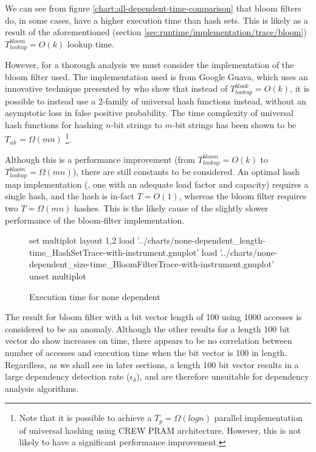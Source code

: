 	We can see from figure \ref{chart:all-dependent-time-comparison} that bloom filters do, in some cases, have a higher execution time than hash sets. This is likely as a result of the aforementioned (section \ref{sec:runtime/implementation/trace/bloom}) $T_{lookup}^{bloom}=O(k)$ lookup time.
	
	However, for a thorough analysis we must consider the implementation of the bloom filter used. The implementation used is from Google Guava, which uses an innovative technique presented by \citet{Azar2006} who show that instead of $T_{lookup}^{blook}=O(k)$, it is possible to instead use a 2-family of universal hash functions instead, without an asymptotic loss in false positive probability. The time complexity of universal hash functions for hashing $n$-bit strings to $m$-bit strings has been shown to be $T_{uh}=\Omega(mn)$ \citep{Mansour1990}\footnote{Note that it is possible to achieve a $T_p=\Omega(log n)$ parallel implementation of universal hashing using CREW PRAM architecture. However, this is not likely to have a significant performance improvement.}.
	
	Although this is a performance improvement (from $T_{lookup}^{bloom}=O(k)$ to $T_{lookup}^{bloom}=\Omega(mn)$), there are still constants to be considered. An optimal hash map implementation (\ie, one with an adequate load factor and capacity) requires a single hash, and the hash is in-fact $T=O(1)$, whereas the bloom filter requires two $T=\Omega(mn)$ hashes. This is the likely cause of the slightly slower performance of the bloom-filter implementation. 
	
	\begin{figure}
		\centering
		\begin{gnuplot}[terminal=pdf]
		set multiplot layout 1,2
			load '../charts/none-dependent_length-time_HashSetTrace-with-instrument.gnuplot'
			load '../charts/none-dependent_size-time_BloomFilterTrace-with-instrument.gnuplot'
		unset multiplot
		\end{gnuplot}
		\caption{Execution time for none dependent}
		\label{chart:none-dependent-time-comparison}
	\end{figure}
	
	The result for bloom filter with a bit vector length of 100 using 1000 accesses is considered to be an anomaly. Although the other results for a length 100 bit vector do show increases on time, there appears to be no correlation between number of accesses and execution time when the bit vector is 100 in length. Regardless, as we shall see in later sections, a length 100 bit vector results in a large dependency detection rate ($\epsilon_{\delta}$), and are therefore unsuitable for dependency analysis algorithms.
	
